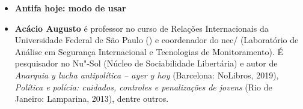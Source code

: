 \begin{itemize}
\item \textbf{Antifa hoje: modo de usar} \lipsum[1]

\item \textbf{Acácio Augusto} é professor no curso de Relações Internacionais da
  Universidade Federal de São Paulo () e coordenador do
  nec/ (Laboratório de Análise em Segurança Internacional e
  Tecnologias de Monitoramento). É pesquisador no Nu"-Sol
  (Núcleo de Sociabilidade Libertária) e autor de
  \emph{Anarquia y lucha antipolítica -- ayer y hoy} (Barcelona:
    NoLibros, 2019), \emph{Política e polícia: cuidados, controles e
  penalizações de jovens} (Rio de Janeiro: Lamparina, 2013), dentre
  outros.

\end{itemize}

